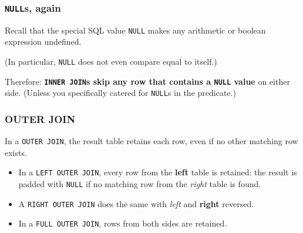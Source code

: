\documentclass[english,serif,mathserif]{beamer}
\begin{document}
\begin{frame}
  \frametitle{\texttt{NULL}s, again}

  Recall that the special SQL value \texttt{NULL} makes any arithmetic or
  boolean expression undefined.

  \+
  (In particular, \texttt{NULL} does not even compare equal to itself.)

  \+ Therefore: \textbf{\texttt{INNER JOIN}s skip any row that contains a
    \texttt{NULL} value} on either side. (Unless you specifically catered for
  \texttt{NULL}s in the predicate.)
\end{frame}

\def\ojoin{\setbox0=\hbox{$\Join$}%
  \rule[0.1ex]{.27em}{.4pt}\llap{\rule[1.3ex]{.27em}{.4pt}}}
\def\leftouterjoin{\mathbin{\ojoin\mkern-5.8mu\Join}}
\def\rightouterjoin{\mathbin{\Join\mkern-5.8mu\ojoin}}
\def\fullouterjoin{\mathbin{\ojoin\mkern-5.8mu\Join\mkern-5.8mu\ojoin}}

\begin{frame}
  \frametitle{OUTER JOIN}

  In a \texttt{OUTER JOIN}, the result table retains each row, even if no other
  matching row exists.

  \+
  \begin{itemize}
  \item In a \texttt{LEFT OUTER JOIN}, every row from the \textbf{left} table is
    retained: the result is padded with \texttt{NULL} if no matching row from
    the \emph{right} table is found.
  \item A \texttt{RIGHT OUTER JOIN} does the same with \emph{left} and
    \textbf{right} reversed.
  \item In a \texttt{FULL OUTER JOIN}, rows from both sides are retained.
  \end{itemize}
\end{frame}
\end{document}
